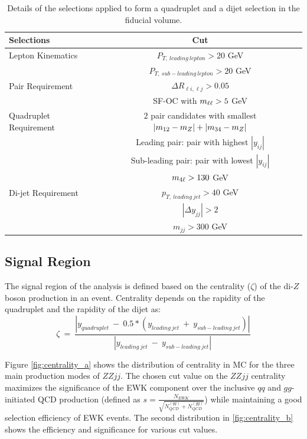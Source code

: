 \begin{table}[ht]
	\caption{Details of the selections applied to form a quadruplet and a dijet selection in the fiducial volume. 
	\label{tab:QuadDijetFidCut}}
	\begin{tabular}{|| l || c ||}
		\hline
		Selections 				&	 		Cut	\\
		\hline\hline
		Lepton Kinematics 		& $P_{T,~leading~lepton} > 20 $ GeV\\
				 				& $P_{T,~sub-leading~lepton} > 20 $ GeV\\
		\hline 
		Pair Requirement 		& $\Delta R_{\ell i,\ell	 j} > 0.05 $\\
		 						& SF-OC with $m_{\ell\ell} > 5$ GeV\\
		\hline
		Quadruplet Requirement	& $2$ pair candidates with smallest $|m_{12}	- m_{Z} | + |m_{34}	- m_{Z} |$	\\
								& Leading pair: pair with highest $|y_{ij}|$\\
								& Sub-leading pair: pair with lowest $|y_{ij}|$\\
								& $m_{4\ell} > 130 $ GeV\\
		\hline
		Di-jet Requirement		& $p_{T,~leading~jet} > 40$ GeV	\\
								& $|\Delta y_{jj}| > 2 $ \\	
								& $m_{jj} > 300$ GeV	\\
		\hline
	\end{tabular}
\end{table}

\subsection{Signal Region}
\label{subsec:SignalRegion}
The signal region of the analysis is defined based on the centrality ($\zeta$) of the di-$Z$boson production in an event. Centrality depends on the rapidity of the quadruplet and the rapidity of the dijet as:
	\begin{equation}
		\zeta~=~\frac{|y_{quadruplet}~-~ 0.5*(y_{leading~jet}~+~y_{sub-leading~jet})| }{|y_{leading~jet}~-~y_{sub-leading~jet}|}
		\label{eq:centr}
	\end{equation}

Figure \ref{fig:centrality_a} shows the distribution of centrality in MC for the three main production modes of $ZZjj$. The chosen cut value on the $ZZjj$ centrality maximizes the significance of the EWK component over the inclusive $qq$ and $gg$-initiated QCD production (defined as $s=\frac{N_{EWK}}{\sqrt{N_{QCD}^{(qq)}+N_{QCD}^{(gg)}}}$) while maintaining a good selection efficiency of EWK events. The second distribution in \ref{fig:centrality_b} shows the efficiency and significance for various cut values.  

